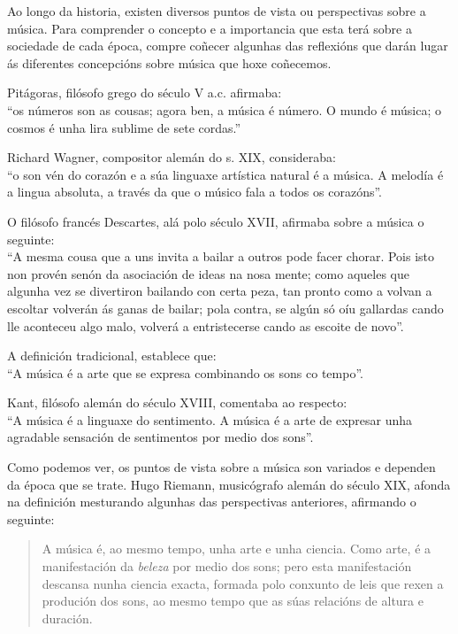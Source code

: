 \documentclass[a4paper, twoside]{templates/ociamthesis}
\providecommand{\tightlist}{%
  \setlength{\itemsep}{0pt}\setlength{\parskip}{0pt}}
\begin{document}
Ao longo da historia, existen diversos puntos de vista ou perspectivas sobre a música. Para comprender o concepto e a importancia que esta terá sobre a sociedade de cada época, compre coñecer algunhas das reflexións que darán lugar ás diferentes concepcións sobre música que hoxe coñecemos.

\begin{description}
\tightlist
\item[Música como ciencia.]
Pitágoras, filósofo grego do século V a.c. afirmaba:\\
``os números son as cousas; agora ben, a música é número. O mundo é música; o cosmos é unha lira sublime de sete cordas.''
\item[Música como arte.]
Richard Wagner, compositor alemán do s. XIX, consideraba:\\
``o son vén do corazón e a súa linguaxe artística natural é a música. A melodía é a lingua absoluta, a través da que o músico fala a todos os corazóns''.
\item[Música como feito musical.]
O filósofo francés Descartes, alá polo século XVII, afirmaba sobre a música o seguinte:\\
``A mesma cousa que a uns invita a bailar a outros pode facer chorar. Pois isto non provén senón da asociación de ideas na nosa mente; como aqueles que algunha vez se divertiron bailando con certa peza, tan pronto como a volvan a escoltar volverán ás ganas de bailar; pola contra, se algún só oíu gallardas cando lle aconteceu algo malo, volverá a entristecerse cando as escoite de novo''.
\item[Música en relación co tempo.]
A definición tradicional, establece que:\\
``A música é a arte que se expresa combinando os sons co tempo''.
\item[Música como expresión de sentimentos.]
Kant, filósofo alemán do século XVIII, comentaba ao respecto:\\
``A música é a linguaxe do sentimento. A música é a arte de expresar unha agradable sensación de sentimentos por medio dos sons''.
\end{description}

Como podemos ver, os puntos de vista sobre a música son variados e dependen da época que se trate. Hugo Riemann, musicógrafo alemán do século XIX, afonda na definición mesturando algunhas das perspectivas anteriores, afirmando o seguinte:

\begin{quote}
A música é, ao mesmo tempo, unha arte e unha ciencia. Como arte, é a manifestación da \emph{beleza} por medio dos sons; pero esta manifestación descansa nunha ciencia exacta, formada polo conxunto de leis que rexen a produción dos sons, ao mesmo tempo que as súas relacións de altura e duración.
\end{quote}
\end{document}
